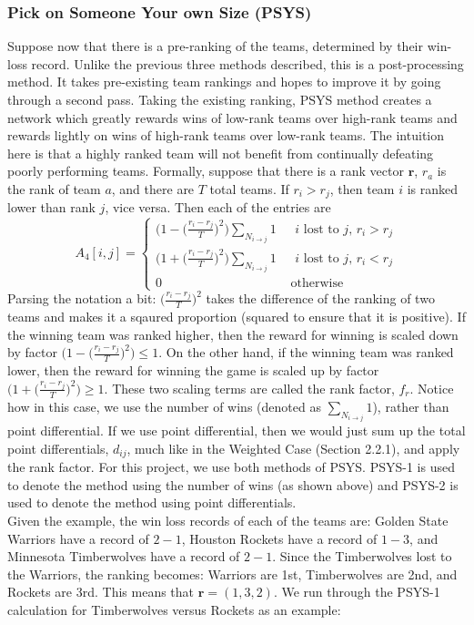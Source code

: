 \documentclass[12pt]{article}%
\begin{document}
\subsubsection{Pick on Someone Your own Size (PSYS)}
  \null\quad\quad Suppose now that there is a pre-ranking of the teams, determined by their win-loss record. Unlike the previous three methods described, this is a post-processing method. It takes pre-existing team rankings and hopes to improve it by going through a second pass. Taking the existing ranking, PSYS method creates a network which greatly rewards wins of low-rank teams over high-rank teams and rewards lightly on wins of high-rank teams over low-rank teams. The intuition here is that a highly ranked team will not benefit from continually defeating poorly performing teams. Formally, suppose that there is a rank vector $\textbf{r}$, $r_a$ is the rank of team $a$, and there are $T$ total teams. If $r_i > r_j$, then team $i$ is ranked lower than rank $j$, vice versa. Then each of the entries are
  \[
  A_{4}[i,j]=
  \begin{cases}
  \Big(1-\Big(\frac{r_i-r_j}{T}\Big)^2\Big)\sum_{N_{i\rightarrow j}}1 &\text{ $i$ lost to $j$, }r_i > r_j\\
  \Big(1+\Big(\frac{r_i-r_j}{T}\Big)^2\Big)\sum_{N_{i\rightarrow j}}1 &\text{ $i$ lost to $j$, }r_i < r_j\\
  0 &\text{ otherwise}
  \end{cases}
  \]
  Parsing the notation a bit: $\Big(\frac{r_i-r_j}{T}\Big)^2$ takes the difference of the ranking of two teams and makes it a sqaured proportion (squared to ensure that it is positive). If the winning team was ranked higher, then the reward for winning is scaled down by factor $\Big(1-\Big(\frac{r_i-r_j}{T}\Big)^2\Big)\le1$. On the other hand, if the winning team was ranked lower, then the reward for winning the game is scaled up by factor $\Big(1+\Big(\frac{r_i-r_j}{T}\Big)^2\Big)\ge1$. These two scaling terms are called the rank factor, $f_r$. Notice how in this case, we use the number of wins (denoted as $\sum_{N_{i\rightarrow j}}1$), rather than point differential. If we use point differential, then we would just sum up the total point differentials, $d_{ij}$, much like in the Weighted Case (Section 2.2.1), and apply the rank factor. For this project, we use both methods of PSYS. PSYS-1 is used to denote the method using the number of wins (as shown above) and PSYS-2 is used to denote the method using point differentials.\\
  \null\quad\quad Given the example, the win loss records of each of the teams are: Golden State Warriors have a record of $2-1$, Houston Rockets have a record of $1-3$, and Minnesota Timberwolves have a record of $2-1$. Since the Timberwolves lost to the Warriors, the ranking becomes: Warriors are 1st, Timberwolves are 2nd, and Rockets are 3rd. This means that $\textbf{r}=(1,3,2)$. We run through the PSYS-1 calculation for Timberwolves versus Rockets as an example:\\
\end{document}
